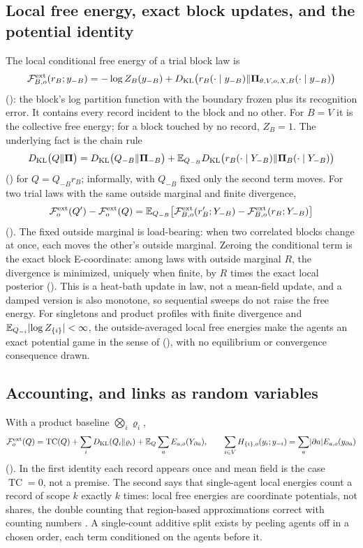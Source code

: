 \subsection{Local free energy, exact block updates, and the potential identity}
\label{comp:ch05-local}

The local conditional free energy of a trial block law is
\[
\mathcal F^{\mathrm{ext}}_{B,o}(r_B;y_{-B})=-\log Z_B(y_{-B})+D_{\mathrm{KL}}\bigl(r_B(\cdot\mid y_{-B})\Vert\boldsymbol\Pi_{\theta,V,o,X,B}(\cdot\mid y_{-B})\bigr)
\]
(): the block's log partition function with the boundary frozen plus its recognition
error. It contains every record incident to the block and no other. For $B=V$ it is the collective free
energy; for a block touched by no record, $Z_B=1$. The underlying fact is the chain rule
\[
D_{\mathrm{KL}}\bigl(Q\Vert\boldsymbol\Pi\bigr)=D_{\mathrm{KL}}\bigl(Q_{-B}\Vert\boldsymbol\Pi_{-B}\bigr)+\mathbb E_{Q_{-B}}D_{\mathrm{KL}}\bigl(r_B(\cdot\mid Y_{-B})\Vert\boldsymbol\Pi_{B}(\cdot\mid Y_{-B})\bigr)
\]
() for $Q=Q_{-B}r_B$; informally, with $Q_{-B}$ fixed only the second
term moves. For two trial laws with the same outside marginal and finite divergence,
\[
\mathcal F^{\mathrm{ext}}_o(Q')-\mathcal F^{\mathrm{ext}}_o(Q)=\mathbb E_{Q_{-B}}\bigl[\mathcal F^{\mathrm{ext}}_{B,o}(r'_B;Y_{-B})-\mathcal F^{\mathrm{ext}}_{B,o}(r_B;Y_{-B})\bigr]
\]
(). The fixed outside marginal is load-bearing: when two correlated blocks
change at once, each moves the other's outside marginal. Zeroing the conditional term is the exact block
E-coordinate: among laws with outside marginal $R$, the divergence is minimized, uniquely when finite, by $R$
times the exact local posterior (). This is a heat-bath update in law, not a
mean-field update, and a damped version is also monotone, so sequential sweeps do not raise the free energy.
For singletons and product profiles with finite divergence and $\mathbb E_{Q_{-i}}\lvert\log Z_{\{i\}}\rvert<\infty$,
the outside-averaged local free energies make the agents an exact potential game in the sense of
\citet{MondererShapley1996} (), with no equilibrium or convergence consequence drawn.

\subsection{Accounting, and links as random variables}
\label{comp:ch05-ledger}

With a product baseline $\bigotimes_i\varrho_i$,
\[
\mathcal F^{\mathrm{ext}}_o(Q)=\operatorname{TC}(Q)+\sum_iD_{\mathrm{KL}}(Q_i\Vert\varrho_i)+\mathbb E_Q\sum_{a}E_{a,o}(Y_{\partial a}),
\qquad
\sum_{i\in V}H_{\{i\},o}(y_i;y_{-i})=\sum_{a}\lvert\partial a\rvert E_{a,o}(y_{\partial a})
\]
(). In the first identity each record appears once and mean field is the case
$\operatorname{TC}=0$, not a premise. The second says that single-agent local energies count a record of scope
$k$ exactly $k$ times: local free energies are coordinate potentials, not shares, the double counting that
region-based approximations correct with counting numbers \citep{Yedidia2005}. A single-count additive split
exists by peeling agents off in a chosen order, each term conditioned on the agents before it.

